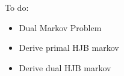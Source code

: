 \documentclass[12pt,twoside]{article}
\begin{document}


\newpage

\tableofcontents

\newpage



\newpage

\newpage
To do:
\begin{itemize}
    \item Dual Markov Problem
    \item Derive primal HJB markov
    \item Derive dual HJB markov
\end{itemize}
\end{document}
